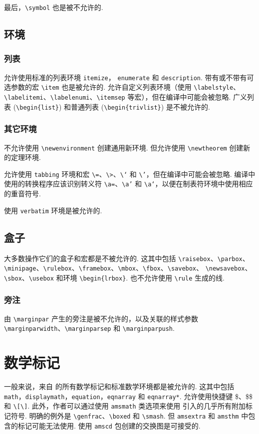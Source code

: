 \documentclass[twocolumn, amssymb, bibnotes, aps, prd, 10pt]{revtex4-2}
\newcommand{\classoption}[1]{\texttt{#1}}
\newcommand{\macro}[1]{\texttt{\textbackslash#1}}
\newcommand{\m}[1]{\macro{#1}}
\newcommand{\env}[1]{\texttt{#1}}
\begin{document}
最后，\m{symbol} 也是被不允许的.

\subsection{环境}
\subsubsection{列表}
允许使用标准的列表环境 \env{itemize}， \env{enumerate} 和 \env{description}. 带有或不带有可选参数的宏 \m{item} 也是被允许的. 允许自定义列表环境（使用 \m{labelstyle}、\m{labelitemi}、\m{labelenumi}、\m{itemsep} 等宏），但在编译中可能会被忽略. 广义列表 (\m{begin\{list\}}) 和普通列表 (\m{begin\{trivlist\}}) 是不被允许的.

\subsubsection{其它环境}
不允许使用 \m{newenvironment} 创建通用新环境. 但允许使用 \m{newtheorem} 创建新的定理环境.

允许使用 \env{tabbing} 环境和宏 \m{=}、\m{>}、\m{`} 和 \m{'}，但在编译中可能会被忽略. 编译中使用的转换程序应该识别转义符 \m{a=}、\m{a'} 和 \m{a`}，以便在制表符环境中使用相应的重音符号.

使用 \env{verbatim} 环境是被允许的.

\subsection{盒子}
大多数操作它们的盒子和宏都是不被允许的. 这其中包括 \m{raisebox}、\m{parbox}、\m{minipage}、\m{rulebox}、\m{framebox}、\m{mbox}、\m{fbox}、\m{savebox}、 \m{newsavebox}、\m{sbox}、\m{usebox} 和环境 \m{begin\{lrbox\}}. 也不允许使用 \m{rule} 生成的线.

\subsubsection{旁注}
由 \m{marginpar} 产生的旁注是被不允许的，以及关联的样式参数 \m{marginparwidth}、\m{marginparsep} 和 \m{marginparpush}.


\section{数学标记}

一般来说，来自 {} 的所有数学标记和标准数学环境都是被允许的. 这其中包括 \env{math}，\env{displaymath}，\env{equation}，\env{eqnarray} 和 \env{eqnarray*}. 允许使用快捷键 \$、\$\$ 和 \verb|\[\]|. 此外，作者可以通过使用 \classoption{amsmath} 类选项来使用  引入的几乎所有附加标记符号. 明确的例外是 \m{genfrac}、\m{boxed} 和 \m{smash}. 但 \texttt{amsextra} 和 \texttt{amsthm} 中包含的标记可能无法使用. 使用 \texttt{amscd} 包创建的交换图是可接受的.
\end{document}
